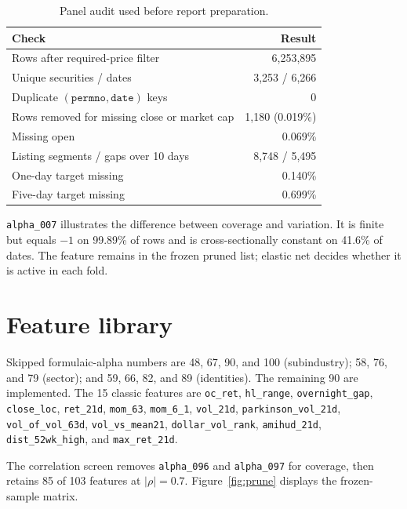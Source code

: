 \documentclass[11pt]{article}
\begin{document}
\begin{table}[ht]
\centering
\caption{Panel audit used before report preparation.}
\small
\begin{tabular}{@{}lr@{}}
\toprule
Check & Result \\
\midrule
Rows after required-price filter & 6{,}253{,}895 \\
Unique securities / dates & 3{,}253 / 6{,}266 \\
Duplicate $(\texttt{permno},\texttt{date})$ keys & 0 \\
Rows removed for missing close or market cap & 1{,}180 (0.019\%) \\
Missing open & 0.069\% \\
Listing segments / gaps over 10 days & 8{,}748 / 5{,}495 \\
One-day target missing & 0.140\% \\
Five-day target missing & 0.699\% \\
\bottomrule
\end{tabular}
\end{table}

\texttt{alpha\_007} illustrates the difference between coverage and
variation. It is finite but equals $-1$ on 99.89\% of rows and is
cross-sectionally constant on 41.6\% of dates. The feature remains in the
frozen pruned list; elastic net decides whether it is active in each fold.

\section{Feature library}
\label{app:features}

\begin{sloppypar}
Skipped formulaic-alpha numbers are 48, 67, 90, and 100 (subindustry);
58, 76, and 79 (sector); and 59, 66, 82, and 89 (identities). The remaining
90 are implemented. The 15 classic features are
\texttt{oc\_ret}, \texttt{hl\_range}, \texttt{overnight\_gap},
\texttt{close\_loc}, \texttt{ret\_21d}, \texttt{mom\_63},
\texttt{mom\_6\_1}, \texttt{vol\_21d}, \texttt{parkinson\_vol\_21d},
\texttt{vol\_of\_vol\_63d}, \texttt{vol\_vs\_mean21},
\texttt{dollar\_vol\_rank}, \texttt{amihud\_21d},
\texttt{dist\_52wk\_high}, and \texttt{max\_ret\_21d}.
\end{sloppypar}

The correlation screen removes \texttt{alpha\_096} and
\texttt{alpha\_097} for coverage, then retains 85 of 103 features at
$|\rho|=0.7$. Figure~\ref{fig:prune} displays the frozen-sample matrix.
\end{document}
